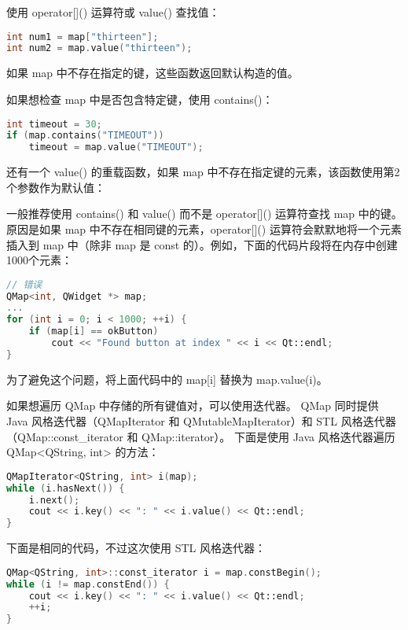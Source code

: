 使用 operator[]() 运算符或 value() 查找值：

\begin{lstlisting}[language=C++]
int num1 = map["thirteen"];
int num2 = map.value("thirteen");
\end{lstlisting}

如果 map 中不存在指定的键，这些函数返回默认构造的值。

如果想检查 map 中是否包含特定键，使用 contains()：

\begin{lstlisting}[language=C++]
int timeout = 30;
if (map.contains("TIMEOUT"))
    timeout = map.value("TIMEOUT");
\end{lstlisting}

还有一个 value() 的重载函数，如果 map 中不存在指定键的元素，该函数使用第2个参数作为默认值：


一般推荐使用 contains() 和 value() 而不是 operator[]() 运算符查找 map 中的键。原因是如果 map 中不存在相同键的元素，operator[]() 运算符会默默地将一个元素插入到 map 中（除非 map 是 const 的）。例如，下面的代码片段将在内存中创建1000个元素：

\begin{lstlisting}[language=C++]
// 错误
QMap<int, QWidget *> map;
...
for (int i = 0; i < 1000; ++i) {
    if (map[i] == okButton)
        cout << "Found button at index " << i << Qt::endl;
}
\end{lstlisting}

为了避免这个问题，将上面代码中的 map[i] 替换为 map.value(i)。

如果想遍历 QMap 中存储的所有键值对，可以使用迭代器。
QMap 同时提供 Java 风格迭代器（QMapIterator 和 QMutableMapIterator）和 STL 风格迭代器（QMap::const\_iterator 和 QMap::iterator）。
下面是使用 Java 风格迭代器遍历 QMap<QString, int> 的方法：

\begin{lstlisting}[language=C++]
QMapIterator<QString, int> i(map);
while (i.hasNext()) {
    i.next();
    cout << i.key() << ": " << i.value() << Qt::endl;
}
\end{lstlisting}

下面是相同的代码，不过这次使用 STL 风格迭代器：

\begin{lstlisting}[language=C++]
QMap<QString, int>::const_iterator i = map.constBegin();
while (i != map.constEnd()) {
    cout << i.key() << ": " << i.value() << Qt::endl;
    ++i;
}
\end{lstlisting}


